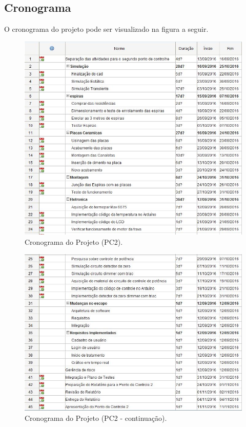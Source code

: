 \subsection{Cronograma}

O cronograma do projeto pode ser visualizado na figura a seguir.

\begin{figure}[ht]
	\centering
	\label{cronogramapc2}
	\includegraphics[keepaspectratio=true,scale=0.6]{figuras/cronogramapc2.JPG}
	\caption{Cronograma do Projeto (PC2).}
\end{figure}

\begin{figure}[ht]
	\centering
	\label{cronogramapc2_cont}
	\includegraphics[keepaspectratio=true,scale=0.6]{figuras/cronogramapc2_cont.JPG}
	\caption{Cronograma do Projeto (PC2 - continuação).}
\end{figure}

